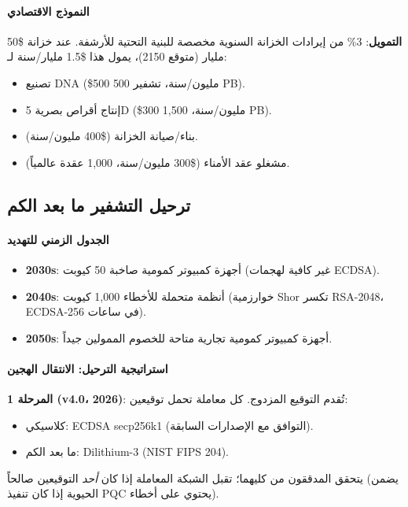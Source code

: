\documentclass[11pt]{article}
\begin{document}
\paragraph{النموذج الاقتصادي}
\textbf{التمويل}: 3\% من إيرادات الخزانة السنوية مخصصة للبنية التحتية للأرشفة. عند خزانة \$50 مليار (متوقع 2150)، يمول هذا \$1.5 مليار/سنة لـ:
\begin{itemize}[noitemsep]
  \item تصنيع DNA (\$500 مليون/سنة، تشفير 500 PB).
  \item إنتاج أقراص بصرية 5D (\$300 مليون/سنة، 1,500 PB).
  \item بناء/صيانة الخزانة (\$400 مليون/سنة).
  \item مشغلو عقد الأمناء (\$300 مليون/سنة، 1,000 عقدة عالمياً).
\end{itemize}

\subsection{ترحيل التشفير ما بعد الكم}

\paragraph{الجدول الزمني للتهديد}
\begin{itemize}[noitemsep]
  \item \textbf{2030s}: أجهزة كمبيوتر كمومية صاخبة 50 كيوبت (غير كافية لهجمات ECDSA).
  \item \textbf{2040s}: أنظمة متحملة للأخطاء 1,000 كيوبت (خوارزمية Shor تكسر RSA-2048، ECDSA-256 في ساعات).
  \item \textbf{2050s}: أجهزة كمبيوتر كمومية تجارية متاحة للخصوم الممولين جيداً.
\end{itemize}

\paragraph{استراتيجية الترحيل: الانتقال الهجين}
\textbf{المرحلة 1 (v4.0، 2026)}: تُقدم التوقيع المزدوج. كل معاملة تحمل توقيعين:
\begin{itemize}[noitemsep]
  \item كلاسيكي: ECDSA secp256k1 (التوافق مع الإصدارات السابقة).
  \item ما بعد الكم: Dilithium-3 (NIST FIPS 204).
\end{itemize}
يتحقق المدققون من كليهما؛ تقبل الشبكة المعاملة إذا كان \emph{أحد} التوقيعين صالحاً (يضمن الحيوية إذا كان تنفيذ PQC يحتوي على أخطاء).
\end{document}
